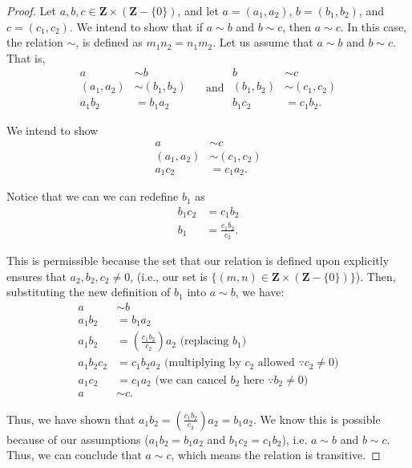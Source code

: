 \documentclass[12pt,oneside]{amsart}
\theoremstyle{remark}
\newcommand{\bfZ}{\mathbf{Z}}
\begin{document}
\begin{proof}
Let $a, b, c \in \bfZ \times (\bfZ - \{0\})$, and let $a = (a_1, a_2)$, $b = (b_1, b_2)$, and $c = (c_1, c_2)$. We intend to show that if $a \sim b$ and $b \sim c$, then $a \sim c$. In this case, the relation $\sim$, is defined as $m_1n_2 = n_1m_2$. Let us assume that $a \sim b$ and $b \sim c$. That is,
\begin{equation}
\begin{split}
         a &\sim b \\
(a_1, a_2) &\sim (b_1, b_2) \\
    a_1b_2 &= b_1a_2
\end{split}
\quad\text{ and }
\begin{split}
         b &\sim c \\
(b_1, b_2) &\sim (c_1, c_2) \\
    b_1c_2 &= c_1b_2.
\end{split}
\end{equation}

We intend to show
\begin{equation}
\begin{split}
         a &\sim c \\
(a_1, a_2) &\sim (c_1, c_2) \\
    a_1c_2 &= c_1a_2.
\end{split}
\end{equation}

Notice that we can we can redefine $b_1$ as
\begin{equation}
\begin{split}
b_1c_2 &= c_1b_2 \\
   b_1 &= \frac{c_1b_2}{c_2}.
\end{split}
\end{equation}

This is permissible because the set that our relation is defined upon explicitly ensures that $a_2, b_2, c_2 \neq 0$, (i.e., our set is $\{(m, n) \in \bfZ \times (\bfZ - \{0\})\}$). Then, substituting the new definition of $b_1$ into $a \sim b$, we have:
\begin{equation}
\begin{split}
     a &\sim b \\
a_1b_2 &= b_1a_2 \\
a_1b_2 &= (\frac{c_1b_2}{c_2})a_2 \text{ (replacing $b_1$)} \\
a_1b_2c_2 &= c_1b_2a_2 \text{ (multiplying by $c_2$ allowed $\because c_2 \neq 0$)} \\
a_1c_2 &= c_1a_2 \text{ (we can cancel $b_2$ here $\because b_2 \neq 0$)} \\
     a &\sim c.
\end{split}
\end{equation}

Thus, we have shown that $a_1b_2 = (\frac{c_1b_2}{c_2})a_2 = b_1a_2$. We know this is possible because of our assumptions ($a_1b_2 = b_1a_2$ and $b_1c_2 = c_1b_2$), i.e. $a \sim b$ and $b \sim c$. Thus, we can conclude that $a \sim c$, which means the relation is transitive.
\end{proof}
\end{document}
